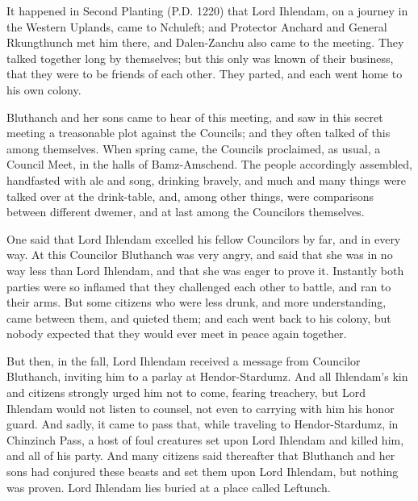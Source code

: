 
\dropcap It happened in Second Planting (P.D. 1220) that Lord Ihlendam, on a journey in the Western Uplands, came to Nchuleft; and Protector Anchard and General Rkungthunch met him there, and Dalen-Zanchu also came to the meeting. They talked together long by themselves; but this only was known of their business, that they were to be friends of each other. They parted, and each went home to his own colony.

Bluthanch and her sons came to hear of this meeting, and saw in this secret meeting a treasonable plot against the Councils; and they often talked of this among themselves. When spring came, the Councils proclaimed, as usual, a Council Meet, in the halls of Bamz-Amschend. The people accordingly assembled, handfasted with ale and song, drinking bravely, and much and many things were talked over at the drink-table, and, among other things, were comparisons between different dwemer, and at last among the Councilors themselves.

One said that Lord Ihlendam excelled his fellow Councilors by far, and in every way. At this Councilor Bluthanch was very angry, and said that she was in no way less than Lord Ihlendam, and that she was eager to prove it. Instantly both parties were so inflamed that they challenged each other to battle, and ran to their arms. But some citizens who were less drunk, and more understanding, came between them, and quieted them; and each went back to his colony, but nobody expected that they would ever meet in peace again together.

But then, in the fall, Lord Ihlendam received a message from Councilor Bluthanch, inviting him to a parlay at Hendor-Stardumz. And all Ihlendam's kin and citizens strongly urged him not to come, fearing treachery, but Lord Ihlendam would not listen to counsel, not even to carrying with him his honor guard. And sadly, it came to pass that, while traveling to Hendor-Stardumz, in Chinzinch Pass, a host of foul creatures set upon Lord Ihlendam and killed him, and all of his party. And many citizens said thereafter that Bluthanch and her sons had conjured these beasts and set them upon Lord Ihlendam, but nothing was proven. Lord Ihlendam lies buried at a place called Leftunch.